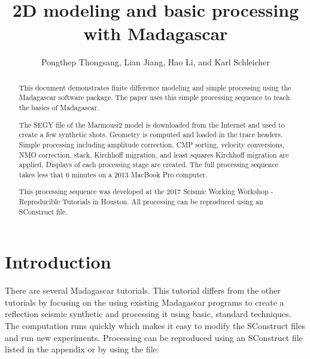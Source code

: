 
\title{2D modeling and basic processing with Madagascar}   
\author{Pongthep Thongsang, Lian Jiang, Hao Li, and Karl Schleicher}


\address{
k\_schleicher@hotmail.com \\
John A. and Katherine G. Jackson School of Geosciences \\
The University of Texas at Austin \\
University Station, Box X \\
Austin, TX 78713-8924}

\maketitle

\begin{abstract}
This document demonstrates finite difference modeling and simple processing
using the Madagascar software package.  The paper uses this simple processing 
sequence to teach the basics of Madagascar. 

The SEGY file of the Marmousi2 model is downloaded from the Internet and used
to create a few synthetic shots.  Geometry is computed and loaded in the
trace headers.   Simple processing including amplitude correction, CMP
sorting, velocity conversions, NMO correction, stack, Kirchhoff migration, and
least squares Kirchhoff migration are applied.  Displays of each processing
stage are created.  The full processing sequence takes less that 6 minutes on
a 2013 MacBook Pro computer. 

This processing sequence was developed at the 2017 Seismic Working Workshop - 
Reproducible Tutorials in Houston.  All processing can be reproduced using an 
SConstruct file.

\end{abstract}

\section{Introduction}
There are several Madagascar tutorials.  This tutorial differs from the other 
tutorials by focusing on the using existing Madagascar programs to create 
a reflection seismic synthetic and processing it using basic, standard 
techniques.  The computation runs quickly which makes it easy to 
modify the SConstruct files and run new experiments.  Processing can be 
reproduced using an SConstruct file listed in the appendix or by using the file:

